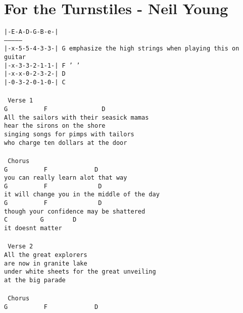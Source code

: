 \newpage
\section{For the Turnstiles - Neil Young}
\label{For the Turnstiles - Neil Young}
\texttt{|-E-A-D-G-B-e-|\\
---------------\\
|-x-5-5-4-3-3-|\ G emphasize the high strings when playing this on guitar\\
|-x-3-3-2-1-1-|\ F ' '\\
|-x-x-0-2-3-2-|\ D\\
|-0-3-2-0-1-0-|\ C\\
\\
\lbrack\ Verse\ 1\rbrack\\
G\ \ \ \ \ \ \ \ \ \ F\ \ \ \ \ \ \ \ \ \ \ \ \ \ \ D\ \ \ \\
All\ the\ sailors\ with\ their\ seasick\ mamas\\
hear\ the\ sirons\ on\ the\ shore\\
singing\ songs\ for\ pimps\ with\ tailors\\
who\ charge\ ten\ dollars\ at\ the\ door\\
\\
\lbrack\ Chorus\rbrack\\
G\ \ \ \ \ \ \ \ \ \ F\ \ \ \ \ \ \ \ \ \ \ \ \ D\\
you\ can\ really\ learn\ alot\ that\ way\\
G\ \ \ \ \ \ \ \ \ \ F\ \ \ \ \ \ \ \ \ \ \ \ \ \ D\\
it\ will\ change\ you\ in\ the\ middle\ of\ the\ day\\
G\ \ \ \ \ \ \ \ \ \ F\ \ \ \ \ \ \ \ \ \ \ \ \ \ D\\
though\ your\ confidence\ may\ be\ shattered\\
C\ \ \ \ \ \ \ \ \ G\ \ \ \ \ \ \ \ D\\
it\ doesnt\ matter\ \\
\\
\lbrack\ Verse\ 2\rbrack\\
All\ the\ great\ explorers\ \\
are\ now\ in\ granite\ lake\\
under\ white\ sheets\ for\ the\ great\ unveiling\\
at\ the\ big\ parade\\
\\
\lbrack\ Chorus\rbrack\\
G\ \ \ \ \ \ \ \ \ \ F\ \ \ \ \ \ \ \ \ \ \ \ \ D\\
}
